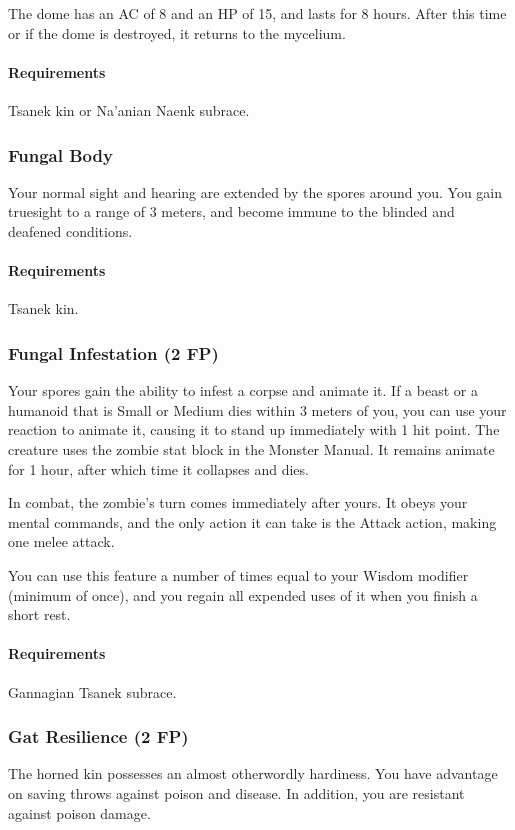     The dome has an AC of 8 and an HP of 15, and lasts for 8 hours.
    After this time or if the dome is destroyed, it returns to the mycelium.
    \paragraph{Requirements} Tsanek kin or Na'anian Naenk subrace.
\subsubsection{Fungal Body} \label{feat::fungalbody}
    Your normal sight and hearing are extended by the spores around you.
    You gain truesight to a range of 3 meters, and become immune to the blinded and deafened conditions.
    \paragraph{Requirements} Tsanek kin.
\subsubsection{Fungal Infestation (2 FP)} \label{feat::fungalinfestation}
    Your spores gain the ability to infest a corpse and animate it.
    If a beast or a humanoid that is Small or Medium dies within 3 meters of you, you can use your reaction to animate it, causing it to stand up immediately with 1 hit point.
    The creature uses the zombie stat block in the Monster Manual.
    It remains animate for 1 hour, after which time it collapses and dies.

    In combat, the zombie's turn comes immediately after yours.
    It obeys your mental commands, and the only action it can take is the Attack action, making one melee attack.

    You can use this feature a number of times equal to your Wisdom modifier (minimum of once), and you regain all expended uses of it when you finish a short rest.
    \paragraph{Requirements} Gannagian Tsanek subrace.
\subsubsection{Gat Resilience (2 FP)} \label{feat::gatresilience}
    The horned kin possesses an almost otherwordly hardiness.
    You have advantage on saving throws against poison and disease.
    In addition, you are resistant against poison damage.
